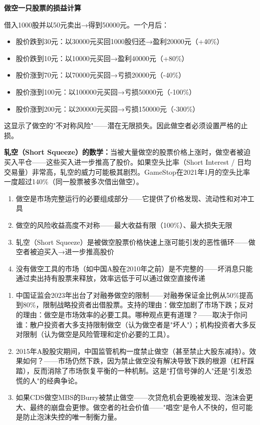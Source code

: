 \documentclass[a4paper,11pt]{ctexbook}
\begin{document}
\begin{quantitative}
\textbf{做空一只股票的损益计算}

借入1000股并以50元卖出→得到50000元。一个月后：

\begin{itemize}
  \item 股价跌到30元：以30000元买回1000股归还→盈利20000元（+40\%）
  \item 股价跌到10元：以10000元买回→盈利40000元（+80\%）
  \item 股价涨到70元：以70000元买回→亏损20000元（-40\%）
  \item 股价涨到100元：以100000元买回→亏损50000元（-100\%）
  \item 股价涨到200元：以200000元买回→亏损150000元（-300\%）
\end{itemize}

这显示了做空的"不对称风险"——潜在无限损失。因此做空者必须设置严格的止损。

\textbf{轧空（Short Squeeze）的数学：}当被大量做空的股票价格上涨时，做空者被迫买入平仓——这些买入进一步推高了股价。如果空头比率（Short Interest / 日均交易量）非常高，轧空的威力可能极其剧烈。GameStop在2021年1月的空头比率一度超过140\%（同一股票被多次借出做空）。
\end{quantitative}

\begin{lessonsummary}
\begin{enumerate}
  \item 做空是市场完整运行的必要组成部分——它提供了价格发现、流动性和对冲工具
  \item 做空的风险收益高度不对称——最大收益有限（100\%）、最大损失无限
  \item 轧空（Short Squeeze）是被做空股票价格快速上涨可能引发的恶性循环——做空者被迫买入→进一步推高股价
  \item 没有做空工具的市场（如中国A股在2010年之前）是不完整的——坏消息只能通过卖出持有股票来释放，效率远低于可以通过做空直接传递
\end{enumerate}
\end{lessonsummary}

\begin{discuss}
\begin{enumerate}
  \item 中国证监会2023年出台了对融券做空的限制——对融券保证金比例从50\%提高到80\%，限制战略投资者出借股票。支持的理由：做空加剧了市场下跌；反对的理由：做空是市场效率的必要工具。哪种观点更有道理？——取决于你问谁：散户投资者大多支持限制做空（认为做空者是"坏人"）；机构投资者大多反对限制（认为做空是风险管理和定价必要的工具）。
  \item 2015年A股股灾期间，中国监管机构一度禁止做空（甚至禁止大股东减持）。效果如何？——市场仍然下跌，因为禁止做空没有解决导致下跌的根源（杠杆踩踏），反而消除了市场恢复平衡的一种机制。这是"打信号弹的人"还是"引发恐慌的人"的经典争论。
  \item 如果CDS做空MBS的Burry被禁止做空——次贷危机会更晚被发现、泡沫会更大、最终的崩盘会更惨。做空者的社会价值——"唱空"是令人不快的，但可能是防止泡沫失控的唯一制衡力量。
\end{enumerate}
\end{discuss}
\end{document}
